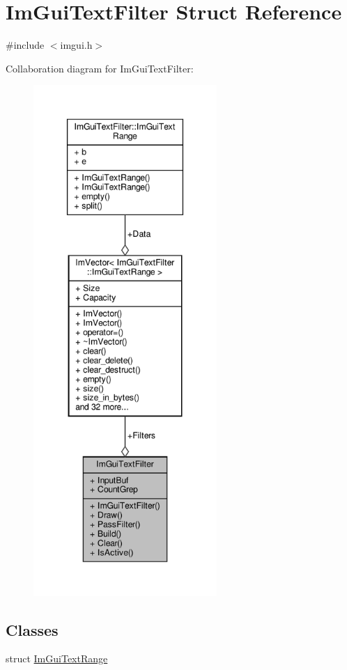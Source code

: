 \hypertarget{structImGuiTextFilter}{}\section{Im\+Gui\+Text\+Filter Struct Reference}
\label{structImGuiTextFilter}


{\ttfamily \#include $<$imgui.\+h$>$}



Collaboration diagram for Im\+Gui\+Text\+Filter\+:
\nopagebreak
\begin{figure}[H]
\begin{center}
\leavevmode
\includegraphics[height=550pt]{structImGuiTextFilter__coll__graph}
\end{center}
\end{figure}
\subsection*{Classes}
\begin{DoxyCompactItemize}
\item 
struct \hyperlink{structImGuiTextFilter_1_1ImGuiTextRange}{Im\+Gui\+Text\+Range}
\end{DoxyCompactItemize}
